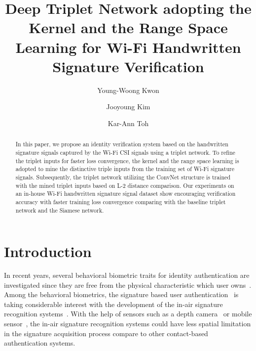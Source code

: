 \documentclass[runningheads]{llncs}
\begin{document}
%
\title{Deep Triplet Network adopting the Kernel and the Range Space Learning for Wi-Fi Handwritten Signature Verification}
%
%
\author{Young-Woong Kwon \and Jooyoung Kim \and Kar-Ann Toh}
%
%
%
\maketitle              %
%
\begin{abstract}
In this paper, we propose an identity verification system based on the handwritten signature signals captured by the Wi-Fi CSI signals using a triplet network. 
To refine the triplet inputs for faster loss convergence, the kernel and the range space learning is adopted to mine the distinctive triple inputs from the training set of Wi-Fi signature signals. 
Subsequently, the triplet network utilizing the ConvNet structure is trained with the mined triplet inputs based on L-2 distance comparison. 
Our experiments on an in-house Wi-Fi handwritten signature signal dataset show encouraging verification accuracy with faster training loss convergence comparing with the baseline triplet network and the Siamese network.

\end{abstract}
%
%
%
\section{Introduction}

In recent years, several behavioral biometric traits for identity authentication are investigated since they are free from the physical characteristic which user owns~\cite{bailador2011analysis}. Among the behavioral biometrics, the signature based user authentication~\cite{galbally2015line,sanmorino2012survey} is taking considerable interest with the development of the in-air signature recognition systems~\cite{galbally2015line,jeon2012system,malik20183dairsig}. 
With the help of sensors such as a depth camera~\cite{malik20183dairsig} or mobile sensor~\cite{jeon2012system}, the in-air signature recognition systems could have less spatial limitation in the signature acquisition process compare to other contact-based authentication systems. 
\end{document}
